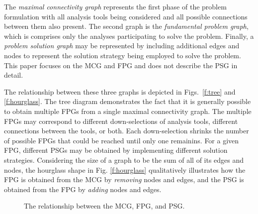   The \emph{maximal connectivity graph} represents the first phase of the problem 
  formulation with all analysis tools being considered and all possible connections 
  between them also present. The second graph is the \emph{fundamental problem graph}, 
  which is comprises only the analyses participating to solve the problem. 
  Finally, a \emph{problem solution graph} may be represented by including additional 
  edges and nodes to represent the solution strategy being employed to solve the 
  problem. This paper focuses on the MCG and FPG and does not describe the PSG in detail.

  The relationship between these three graphs is depicted in Figs.~\ref{f:tree} and \ref{f:hourglass}. 
  The tree diagram demonstrates the fact that it is generally possible to obtain 
  multiple FPGs from a single maximal connectivity graph. The multiple FPGs may correspond to 
  different down-selections of analysis tools, different connections between the tools, 
  or both. Each down-selection shrinks the number of possible FPGs that could be reached 
  until only one remainins. For a given FPG, different PSGs may be obtained by implementing 
  different solution strategies. Considering the size of a graph to be the sum of all of its
  edges and nodes, the hourglass shape in Fig. \ref{f:hourglass} qualitatively illustrates how
  the FPG is obtained from the MCG by \emph{removing} nodes and edges, 
  and the PSG is obtained from the FPG by \emph{adding} nodes and edges.
  \begin{figure}[htb!]
    \centering
  \caption{The relationship between the MCG, FPG, and PSG.}
  \end{figure}